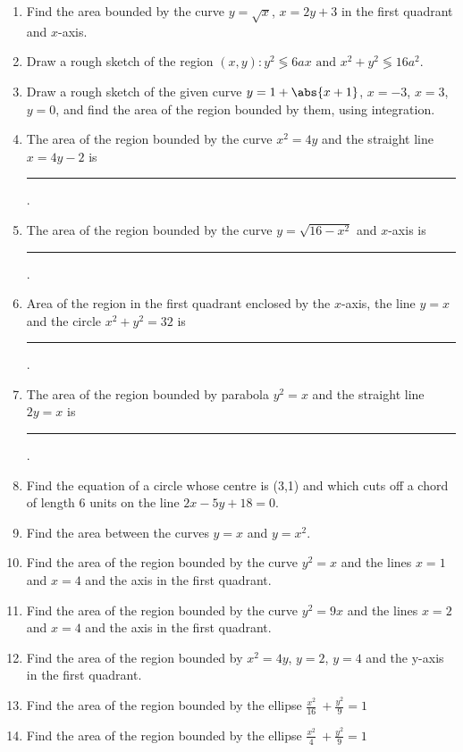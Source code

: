 \begin{enumerate}[label=\thesubsection.\arabic*,ref=\thesubsection.\theenumi]
\item Find the area bounded by the curve $y = \sqrt{x}$, $x = 2y + 3$ in the first quadrant and $x$-axis.
\item Draw a rough sketch of the region ${(x, y) : y^2 \lessgtr 6ax\text{ and }x^2 + y^2 \lessgtr 16a^2}$.
\item Draw a  rough sketch of the given curve $y =1 + \abs{x + 1}$, $x = -3$, $x = 3$, $y = 0$, and find the area of the region bounded by them, using integration.
\item The area of the region bounded by the curve $x^2 = 4y$ and the straight line $x = 4y - 2$ is
	\rule{1cm}{0.1pt}.
\item The area of the region bounded by the curve $y = \sqrt{16 - x^2}$ and $x$-axis is 
	\rule{1cm}{0.1pt}.
\item Area of the region in the first quadrant enclosed by the $x$-axis, the line $y = x$ and the circle $x^2 + y^2 = 32$ is 
	\rule{1cm}{0.1pt}.
\item The area of the region bounded by parabola $y^2 = x$ and the straight line $2y = x$ is
	\rule{1cm}{0.1pt}.
\item Find the equation of a circle whose centre is (3,1) and which cuts off a chord of length  6 units on the  line $2x-5y+18=0$.
\item 
Find the area between the curves $y=x$ and $y=x^2$.
\\
\solution
\label{chapters/12/8/3/2}

\item 
Find the area of the region bounded by the curve $y^2=x$ and the lines $x=1$ and $x=4$ and the axis in the first quadrant.
\label{chapters/12/8/1/1}
	\\
	\solution

\item 
Find the area of the region bounded by the curve $y^2=9x$ and the lines $x=2$ and $x=4$ and the axis in the first quadrant.
\item Find the area of the region bounded by ${x}^2
= 4{y}$, ${y} = 2$, ${y} = 4$ and the y-axis in the
first quadrant.
\label{chapters/12/8/1/3}
\item Find the area of the region bounded by the ellipse \(\frac{{x}^2}{16}\ + \frac{{y}^2}{9} = 1\)
\label{chapters/12/8/1/4}
\item Find the area of the region bounded by the ellipse \(\frac{{x}^2}{4}\ + \frac{{y}^2}{9} = 1\)
\label{chapters/12/8/1/5}

\end{enumerate}
